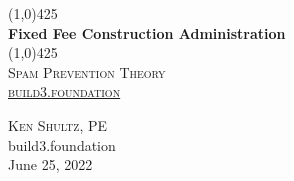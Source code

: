 \begin{titlepage}
    \begin{center}
        \line(1,0){425} \\
        [0.25in]
        \huge{\bfseries Fixed Fee Construction Administration} \\
        [2mm]
        \line(1,0){425} \\
        [1.5cm]
        \textsc{\LARGE Spam Prevention Theory} \\
        [0.75cm]
        \textsc{\Large \href{https://www.build3.foundation}{build3.foundation}} \\
        [10cm]
    \end{center}
    \begin{flushright}
        \textsc{\large Ken Shultz, PE \\}
        build3.foundation \\
        June 25, 2022 \\
    \end{flushright}
\end{titlepage}